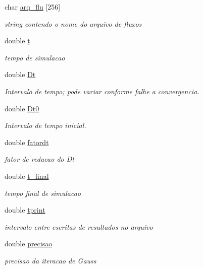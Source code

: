 \begin{DoxyCompactItemize}
char \hyperlink{classDG__Prob_a0b3433f004931fd5f503928bf403d493}{arq\+\_\+flu} \mbox{[}256\mbox{]}
\begin{DoxyCompactList}\small\item\em string contendo o nome do arquivo de fluxos \end{DoxyCompactList}\item 
double \hyperlink{classDG__Prob_a5106aac0b8fa9508c2a40c2f177c9b02}{t}
\begin{DoxyCompactList}\small\item\em tempo de simulacao \end{DoxyCompactList}\item 
double \hyperlink{classDG__Prob_ad4de8afc3624f6559222e8f1f10fce6f}{Dt}
\begin{DoxyCompactList}\small\item\em Intervalo de tempo; pode variar conforme falhe a convergencia. \end{DoxyCompactList}\item 
double \hyperlink{classDG__Prob_a731fcad311bbf188572e164ca2506b66}{Dt0}
\begin{DoxyCompactList}\small\item\em Intervalo de tempo inicial. \end{DoxyCompactList}\item 
double \hyperlink{classDG__Prob_a6cb8efeb65d87835ff8704d116bdc100}{fatordt}
\begin{DoxyCompactList}\small\item\em fator de reducao do Dt \end{DoxyCompactList}\item 
double \hyperlink{classDG__Prob_a932346b7bdab75852dffa347eceb95b6}{t\+\_\+final}
\begin{DoxyCompactList}\small\item\em tempo final de simulacao \end{DoxyCompactList}\item 
double \hyperlink{classDG__Prob_a29260e59aa92d97bd90a9fee709c3115}{tprint}
\begin{DoxyCompactList}\small\item\em intervalo entre escritas de resultados no arquivo \end{DoxyCompactList}\item 
double \hyperlink{classDG__Prob_aab5dca55ee328d1c77a7439ea90367a6}{precisao}
\begin{DoxyCompactList}\small\item\em precisao da iteracao de Gauss \end{DoxyCompactList}\item 

\end{DoxyCompactItemize}

